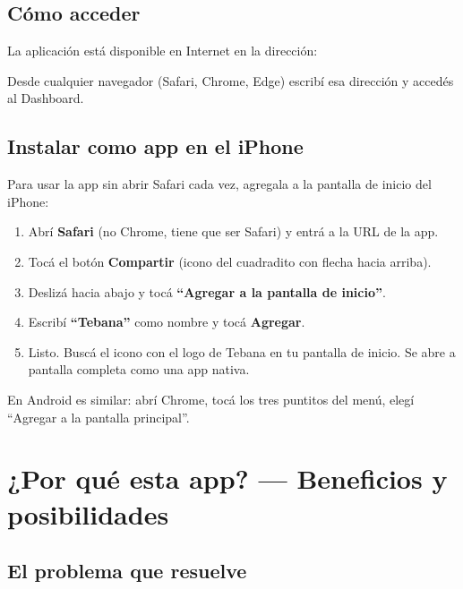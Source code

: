 \documentclass[11pt,a4paper]{report}
\begin{document}
\section{Cómo acceder}

La aplicación está disponible en Internet en la dirección:

\begin{center}
\end{center}

Desde cualquier navegador (Safari, Chrome, Edge) escribí esa dirección y accedés al Dashboard.

\section{Instalar como app en el iPhone}

Para usar la app sin abrir Safari cada vez, agregala a la pantalla de inicio del iPhone:

\begin{enumerate}[leftmargin=*]
  \item Abrí \textbf{Safari} (no Chrome, tiene que ser Safari) y entrá a la URL de la app.
  \item Tocá el botón \textbf{Compartir} (icono del cuadradito con flecha hacia arriba).
  \item Deslizá hacia abajo y tocá \textbf{``Agregar a la pantalla de inicio''}.
  \item Escribí \textbf{``Tebana''} como nombre y tocá \textbf{Agregar}.
  \item Listo. Buscá el icono con el logo de Tebana en tu pantalla de inicio. Se abre a pantalla completa como una app nativa.
\end{enumerate}

\begin{tipbox}
En Android es similar: abrí Chrome, tocá los tres puntitos del menú, elegí ``Agregar a la pantalla principal''.
\end{tipbox}

\chapter{¿Por qué esta app? — Beneficios y posibilidades}

\section{El problema que resuelve}
\end{document}
